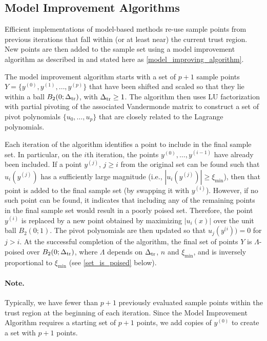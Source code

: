 \documentclass{article}
\begin{document}
\subsection{Model Improvement Algorithms}

\label{model_improvement_algorithms}
Efficient implementations of model-based methods re-use sample points from previous iterations that fall within (or at least near) the current trust region.
New points are then added to the sample set using a model improvement algorithm as described in 
\cite{introduction_book} and stated here as \cref{model_improving_algorithm}.

The model improvement algorithm starts with a set of $p+1$ sample points $Y = \{y^{(0)}, y^{(1)}, \ldots, y^{(p)}\}$ that have been shifted and scaled so that they lie within a ball $B_2(0;\Delta_{\textrm{tr}})$, with $\Delta_{\textrm{tr}} \ge 1$.   
The algorithm then uses LU factorization with partial pivoting of the 
associated Vandermonde matrix to construct a set of pivot polynomials $\{u_0, \ldots, u_p\}$ that are closely related to the Lagrange polynomials. 

Each iteration of the algorithm identifies a point to include in the final sample set.
In particular, on the $i$th iteration, the points $y^{(0)}, \ldots, y^{(i-1)}$ have already been included.   
If a point $y^{(j)}$,  $j \ge i$ from the original set can be found such that 
$u_i(y^{(j)})$ has a sufficiently large magnitude  (i.e.,  $|u_i(y^{(j)})| \ge \xi_{\min}$),  
then that point is added to the final sample set (by swapping it with $y^{(i)}$).
However, if no such point can be found, 
it indicates that including any of the remaining points in the final sample set would result in a poorly poised set.
Therefore, the point $y^{(i)}$ is replaced by a new point obtained by maximizing $|u_i(x)|$ 
over the unit ball $B_2(0;1)$.
The pivot polynomials are then updated so that 
$u_j(y^{(i})) = 0$ for $j > i$.
At the successful completion of the algorithm, the final set of points $Y$ is $\Lambda$-poised over $B_2(0;\Delta_{\textrm{tr}})$,
where $\Lambda$ depends on $\Delta_{\textrm{tr}}$,  $n$ and $\xi_{\min}$,  and is inversely proportional to $\xi_{\min}$
(see \cref{set_is_poised} below).
\paragraph*{Note.}   
Typically,  we have fewer than $p+1$ previously evaluated sample points within the trust region at the beginning of each iteration.
Since the Model Improvement Algorithm requires a starting set of $p+1$ points, 
we add copies of $y^{(0)}$ to create a set with $p+1$ points.
\end{document}
